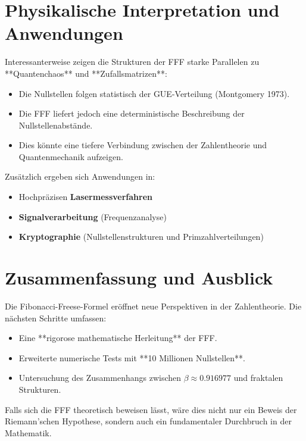 \documentclass[a4paper,12pt]{article}
\begin{document}
\section{Physikalische Interpretation und Anwendungen}
Interessanterweise zeigen die Strukturen der FFF starke Parallelen zu **Quantenchaos** und **Zufallsmatrizen**:
\begin{itemize}
    \item Die Nullstellen folgen statistisch der GUE-Verteilung (Montgomery 1973).
    \item Die FFF liefert jedoch eine deterministische Beschreibung der Nullstellenabstände.
    \item Dies könnte eine tiefere Verbindung zwischen der Zahlentheorie und Quantenmechanik aufzeigen.
\end{itemize}

Zusätzlich ergeben sich Anwendungen in:
\begin{itemize}
    \item Hochpräzisen \textbf{Lasermessverfahren}
    \item \textbf{Signalverarbeitung} (Frequenzanalyse)
    \item \textbf{Kryptographie} (Nullstellenstrukturen und Primzahlverteilungen)
\end{itemize}

\section{Zusammenfassung und Ausblick}
Die Fibonacci-Freese-Formel eröffnet neue Perspektiven in der Zahlentheorie. Die nächsten Schritte umfassen:
\begin{itemize}
    \item Eine **rigorose mathematische Herleitung** der FFF.
    \item Erweiterte numerische Tests mit **10 Millionen Nullstellen**.
    \item Untersuchung des Zusammenhangs zwischen $\beta \approx 0.916977$ und fraktalen Strukturen.
\end{itemize}

Falls sich die FFF theoretisch beweisen lässt, wäre dies nicht nur ein Beweis der Riemann’schen Hypothese, sondern auch ein fundamentaler Durchbruch in der Mathematik.
\end{document}
